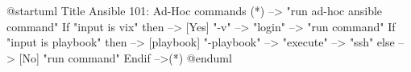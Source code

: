 @startuml
Title Ansible 101: Ad-Hoc commands
(*)  --> "run ad-hoc ansible command"
If "input is vix" then
--> [Yes] "-v"
--> "login"
--> "run command"
If "input is playbook" then
--> [playbook] "-playbook"
--> "execute"
--> "ssh"
else
--> [No] "run command"
Endif
-->(*)
@enduml
